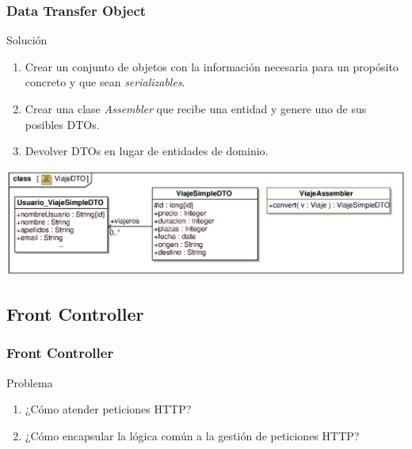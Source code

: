 \documentclass[handout,a4paper,slidestop,xcolor=pst,blue]{beamer}
\begin{document}
\begin{frame}[c]
    \frametitle{Data Transfer Object}
    \begin{block}{Solución}
        \begin{enumerate}[<+->]
            \item Crear un conjunto de objetos con la información necesaria para un propósito concreto y que sean \emph{serializables}.
            \item Crear una clase \emph{Assembler} que recibe una entidad y genere uno de sus posibles DTOs.
            \item Devolver DTOs en lugar de entidades de dominio.
        \end{enumerate}
    \end{block}
    \begin{center}
        \includegraphics[width=\linewidth]{images/patterns/dto01.eps}
    \end{center}
\end{frame}

\subsection{Front Controller}

\begin{frame}[c]
    \frametitle{Front Controller}
    \begin{block}{Problema}
        \begin{enumerate}[<+->]
            \item ¿Cómo atender peticiones HTTP?
            \item ¿Cómo encapsular la lógica común a la gestión de peticiones HTTP?
        \end{enumerate}
    \end{block}
\end{frame}
\end{document}
